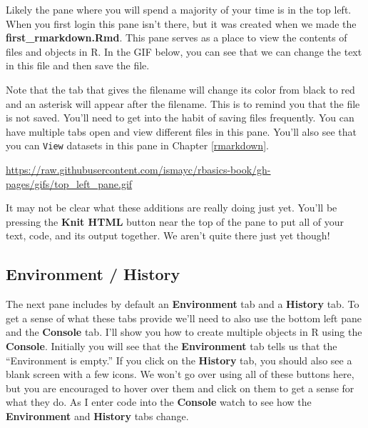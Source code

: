 \documentclass[]{tufte-book}
\theoremstyle{definition}
\theoremstyle{definition}
\theoremstyle{remark}
\begin{document}
Likely the pane where you will spend a majority of your time is in the
top left. When you first login this pane isn't there, but it was created
when we made the \textbf{first\_rmarkdown.Rmd}. This pane serves as a
place to view the contents of files and objects in R. In the GIF below,
you can see that we can change the text in this file and then save the
file.

Note that the tab that gives the filename will change its color from
black to red and an asterisk will appear after the filename. This is to
remind you that the file is not saved. You'll need to get into the habit
of saving files frequently. You can have multiple tabs open and view
different files in this pane. You'll also see that you can \texttt{View}
datasets in this pane in Chapter \ref{rmarkdown}.

\vspace{0.1in}

\begin{center}\footnotesize{\url{https://raw.githubusercontent.com/ismayc/rbasics-book/gh-pages/gifs/top_left_pane.gif}}\end{center}

\vspace{0.1in}

It may not be clear what these additions are really doing just yet.
You'll be pressing the \textbf{Knit HTML} button near the top of the
pane to put all of your text, code, and its output together. We aren't
quite there just yet though!

\subsection{Environment / History}\label{environment-history}

The next pane includes by default an \textbf{Environment} tab and a
\textbf{History} tab. To get a sense of what these tabs provide we'll
need to also use the bottom left pane and the \textbf{Console} tab. I'll
show you how to create multiple objects in R using the \textbf{Console}.
Initially you will see that the \textbf{Environment} tab tells us that
the ``Environment is empty.'' If you click on the \textbf{History} tab,
you should also see a blank screen with a few icons. We won't go over
using all of these buttons here, but you are encouraged to hover over
them and click on them to get a sense for what they do. As I enter code
into the \textbf{Console} watch to see how the \textbf{Environment} and
\textbf{History} tabs change.
\end{document}
